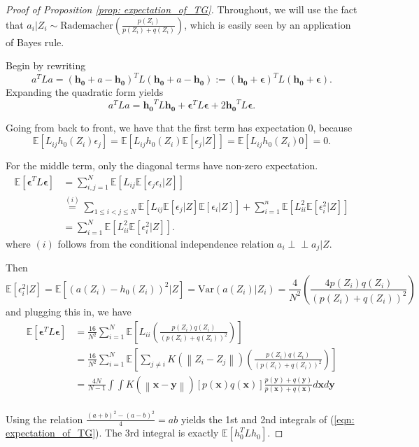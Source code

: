 \documentclass{article}
\newcommand{\Expect}[1]{\mathbb{E}\left[ #1 \right]}
\newcommand{\Var}[1]{\mathrm{Var}\left( #1 \right)}
\newcommand{\norm}[1]{\left\lVert#1\right\rVert}
\newcommand{\Perp}{\perp \! \! \! \perp}
\newcommand{\x}{\textbf{x}}
\newcommand{\y}{\textbf{y}}
\theoremstyle{alden}
\theoremstyle{definition}
\theoremstyle{remark}
\begin{document}
\begin{proof}[Proof of Proposition \ref{prop: expectation_of_TG}]
	Throughout, we will use the fact that $a_i | Z_i \sim \text{Rademacher}(\frac{p(Z_i)}{p(Z_i) + q(Z_i)})$, which is easily seen by an application of Bayes rule.
	
	
	Begin by rewriting
	\begin{equation*}
	a^T L a = (\mathbf{h_0} + a - \mathbf{h_0})^T L (\mathbf{h_0} + a - \mathbf{h_0}) := (\mathbf{h_0} + \mathbf{\epsilon})^T L (\mathbf{h_0} + \mathbf{\epsilon}).
	\end{equation*}
	Expanding the quadratic form yields
	\begin{equation*}
	a^T L a = \mathbf{h_0}^T L \mathbf{h_0} + \mathbf{\epsilon}^T L \mathbf{\epsilon} + 2 \mathbf{h_0}^T L \mathbf{\epsilon}.
	\end{equation*}
	
	Going from back to front, we have that the first term has expectation $0$, because
	\begin{equation*}
	\Expect{L_{ij} h_0(Z_i) \epsilon_{j}} = \Expect{L_{ij} h_0(Z_i) \Expect{\epsilon_{j} | Z} } = \Expect{L_{ij} h_0(Z_i) 0} = 0.
	\end{equation*}
	
	For the middle term, only the diagonal terms have non-zero expectation.
	\begin{align*}
	\Expect{ \mathbf{\epsilon}^T L \mathbf{\epsilon} } & = \sum_{i,j = 1}^{N} \Expect{L_{ij} \Expect{\epsilon_{j} \epsilon_i | Z}} \\
	& \overset{(i)}{=} \sum_{1 \leq i < j \leq N} \Expect{L_{ij} \Expect{\epsilon_{j} | Z} \Expect{\epsilon_i | Z}} + \sum_{i = 1}^n \Expect{L_{ii}^2 \Expect{\epsilon_i^2 | Z}} \\
	& = \sum_{i = 1}^N \Expect{L_{ii}^2 \Expect{\epsilon_i^2 | Z}}.
	\end{align*}
	where $(i)$ follows from the conditional independence relation $a_i \Perp a_j | Z$. 
	
	Then 
	\begin{equation*}
	\Expect{\epsilon_i^2 | Z} = \Expect{(a(Z_i) - h_0(Z_i))^2 | Z} = \Var{a(Z_i) | Z_i} = \frac{4}{N^2} \left(\frac{4 p(Z_i) q(Z_i)}{(p(Z_i) + q(Z_i))^2}\right)
	\end{equation*}
	and plugging this in, we have
	\begin{align*}
	\Expect{ \mathbf{\epsilon}^T L \mathbf{\epsilon} } & = \frac{16}{N^2}\sum_{i = 1}^{N} \Expect{L_{ii} \left(\frac{p(Z_i) q(Z_i)}{(p(Z_i) + q(Z_i))^2}\right)} \\
	& = \frac{16}{N^2} \sum_{i = 1}^{N} \Expect{ \sum_{j \neq i}K(\norm{Z_i - Z_j}) \left(\frac{p(Z_i) q(Z_i)}{(p(Z_i) + q(Z_i))^2}\right)} \\
	& = \frac{4 N}{N - 1} \int \int K(\norm{\x - \y}) \left[p(\x) q(\x)\right] \frac{p(\y) + q(\y)}{p(\x) + q(\x)} d\x d\y \\
	\end{align*}
	
	Using the relation $\frac{(a + b)^2 - (a - b)^2}{4} = ab$ yields the 1st and 2nd integrals of (\ref{eqn: expectation_of_TG}). The 3rd integral is exactly $\Expect{h_0^T L h_0}$. 
	
\end{proof}
\end{document}

